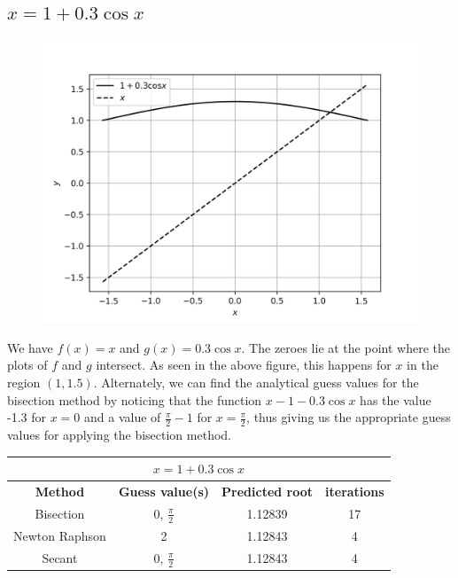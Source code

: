 \documentclass[12,a4paper]{article}
\begin{document}
    \subsection{$x = 1 + 0.3\cos x$}
    \begin{figure}[H]
        \centering
        \includegraphics[width = \textwidth]{plots/p3.png}
        \label{fig:my_label}
    \end{figure}
    We have $f(x) = x$ and $g(x) = 0.3\cos x$. The zeroes lie at the point where the plots of $f$ and $g$ intersect. As seen in the above figure, this happens for $x$ in the region $(1,1.5)$. Alternately, we can find the analytical guess values for the bisection method by noticing that the function $x - 1 - 0.3\cos x$ has the value -1.3 for $x = 0$ and a value of $\frac{\pi}{2} - 1$ for $x = \frac{\pi}{2}$, thus giving us the appropriate guess values for applying the bisection method.
    \begin{table}[h!]
        \centering
        \begin{tabular}{|c|c c c|} 
            \hline
            \multicolumn{4}{|c|}{$x = 1 + 0.3\cos x$}\\
            \hline
            \textbf{Method}&\textbf{Guess value(s)}&\textbf{Predicted root}&\textbf{iterations} \\ [0.5ex] 
            \hline
            Bisection & 0, $\frac{\pi}{2}$ & 1.12839 & 17 \\ 
            Newton Raphson & 2 & 1.12843 & 4 \\
            Secant & 0, $\frac{\pi}{2}$ & 1.12843 & 4 \\[1ex] 
            \hline
        \end{tabular}
    \end{table}
\end{document}
